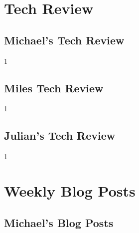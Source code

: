 \documentclass[draftclsnofoot, onecolumn, 10pt, compsoc]{IEEEtran}
\begin{document}
\newpage

\section{Tech Review}
  \subsection{Michael's Tech Review}
  	1     \newpage   
    
  \subsection{Miles Tech Review}
    1     \newpage 
      
  \subsection{Julian's Tech Review}
    1      \newpage 
  


\section{Weekly Blog Posts}
  \subsection{Michael's Blog Posts}
\end{document}
